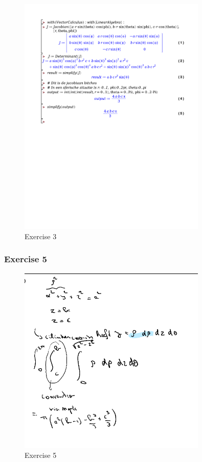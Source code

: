 \documentclass[a4paper]{report}
\begin{document}
\begin{figure}[H]
	\centering
	\includegraphics[width=0.8\textwidth]{exercises/huis_5_ex_3.pdf}
	\caption{Exercise 3}
	\label{fig:huis_5_ex_3}
\end{figure}

\subsubsection{Exercise 5}

\begin{figure}[H]
	\centering
	\includegraphics[width=0.8\textwidth]{assets/huis_5_ex_5.png}
	\caption{Exercise 5}
	\label{fig:huis_5_ex_5}
\end{figure}
\end{document}

